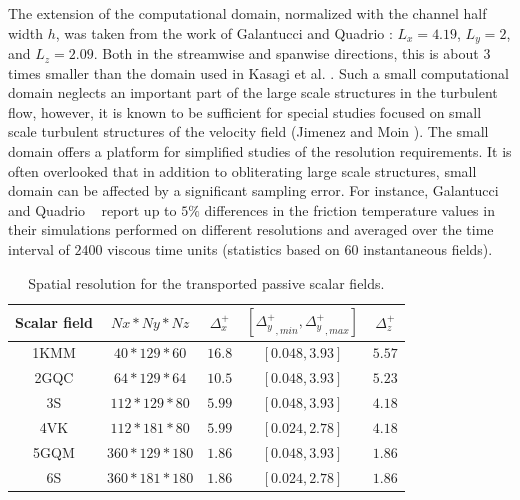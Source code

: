 \documentclass[review]{elsarticle}
\newcommand{\gqcite}{Galantucci and Quadrio \cite{galantucci2010very}}
\begin{document}
The extension of the computational domain{\color{red}, normalized with the channel half width $h$,} was taken from the work of \gqcite: $L_x=4.19$, $L_y=2$, and $L_z=2.09$.
{\color{red} Both in the streamwise and spanwise directions, this is about $3$ times smaller than the domain used in Kasagi et al. \citep{kasagi1991direct}.}
Such a small computational domain neglects an important part of the large scale structures in the turbulent flow, however, it is known to be sufficient for special studies focused on small scale turbulent structures of the velocity field (Jimenez and Moin \cite{jimenez1991minimal}). The small domain offers a platform for simplified studies of the resolution requirements. It is often overlooked that in addition to obliterating large scale structures, small domain can be affected by a significant sampling error. For instance, \gqcite ~ report up to $5\%$ differences in the friction temperature values in their simulations performed on different resolutions and averaged over the time interval of $2400$ viscous time units (statistics based on $60$ instantaneous fields).

\begin{table}
\begin{center}
\begin{tabular}{|c|c|c|c|c|}
\hline
Scalar field & $Nx*Ny*Nz$ & $\Delta_x^+$ & $\left[{\Delta_y^+}_{,min},{\Delta_y^+}_{,max}\right]$ & $\Delta_z^+$ \\
\hline 1KMM & $40*129*60$ & $16.8$ & $\left[0.048,3.93\right]$ & $5.57$ \\
\hline 2GQC & $64*129*64$ & $10.5$ & $\left[0.048,3.93\right]$ & $5.23$ \\
\hline 3S  & $112*129*80$ & $5.99$ & $\left[0.048,3.93\right]$ & $4.18$ \\
\hline 4VK & $112*181*80$ & $5.99$ & $\left[0.024,2.78\right]$ & $4.18$ \\
\hline 5GQM & $360*129*180$ & $1.86$ & $\left[0.048,3.93\right]$ & $1.86$ \\
\hline 6S & $360*181*180$ & $1.86$ & $\left[0.024,2.78\right]$ & $1.86$ \\
\hline
\end{tabular}
\caption{Spatial resolution for the transported passive scalar fields.}
\label{tb-resolution}
\end{center}
\end{table}
\end{document}

